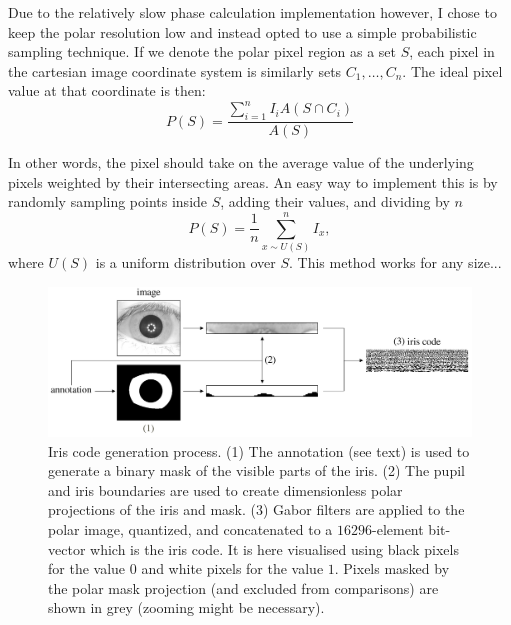 Due to the relatively slow phase calculation implementation however, I chose to keep the polar resolution low and instead opted to use a simple probabilistic sampling technique. If we denote the polar pixel region as a set $S$, each pixel in the cartesian image coordinate system is similarly sets $C_1, \dots, C_n$. The ideal pixel value at that coordinate is then:
\begin{equation}
    P(S) = \frac{\sum_{i=1}^n I_i A(S\cap C_i)}{A(S)}
\end{equation}

In other words, the pixel should take on the average value of the underlying pixels weighted by their intersecting areas. An easy way to implement this is by randomly sampling points inside $S$, adding their values, and dividing by $n$
\begin{equation}
    P(S) = \frac{1}{n}\sum_{x \sim U(S)}^n I_{x},
\end{equation}
where $U(S)$ is a uniform distribution over $S$. This method works for any size...

\begin{figure}
    \centering
    \includegraphics[width=1\linewidth]{figures/iris-code-gen.pdf}
    \caption{Iris code generation process. (1) The annotation (see text) is used to generate a binary mask of the visible parts of the iris. (2) The pupil and iris boundaries are used to create dimensionless polar projections of the iris and mask. (3) Gabor filters are applied to the polar image, quantized, and concatenated to a $16296$-element bit-vector which is the iris code. It is here visualised using black pixels for the value $0$ and white pixels for the value $1$. Pixels masked by the polar mask projection (and excluded from comparisons) are shown in grey (zooming might be necessary). }
    \label{fig:iris-code-gen}
\end{figure}


